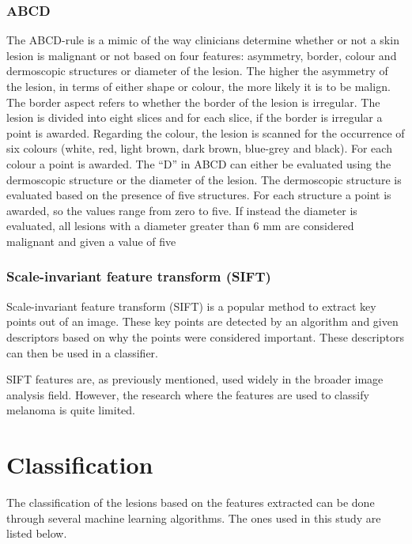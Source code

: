 \documentclass{kththesis}
\begin{document}
\subsubsection{ABCD}

The ABCD-rule is a mimic of the way clinicians determine whether or not a skin lesion is malignant or not based on four features: asymmetry, border, colour and dermoscopic structures or diameter of the lesion. The higher the asymmetry of the lesion, in terms of either shape or colour, the more likely it is to be malign. The border aspect refers to whether the border of the lesion is irregular. The lesion is divided into eight slices and for each slice, if the border is irregular a point is awarded. Regarding the colour, the lesion is scanned for the occurrence of six colours (white, red, light brown, dark brown, blue-grey and black). For each colour a point is awarded. The “D” in ABCD can either be evaluated using the dermoscopic structure or the diameter of the lesion. The dermoscopic structure is evaluated based on the presence of five structures. For each structure a point is awarded, so the values range from zero to five. If instead the diameter is evaluated, all lesions with a diameter greater than 6 mm are considered malignant and given a value of five %

\subsubsection{Scale-invariant feature transform (SIFT)}

Scale-invariant feature transform (SIFT) is a popular method to extract key points out of an image. These key points are detected by an algorithm and given descriptors based on why the points were considered important. These descriptors can then be used in a classifier.

SIFT features are, as previously mentioned, used widely in the broader image analysis field. However, the research where the features are used to classify melanoma is quite limited.

\section{Classification}

The classification of the lesions based on the features extracted can be done through several machine learning algorithms. The ones used in this study are listed below.
\end{document}
